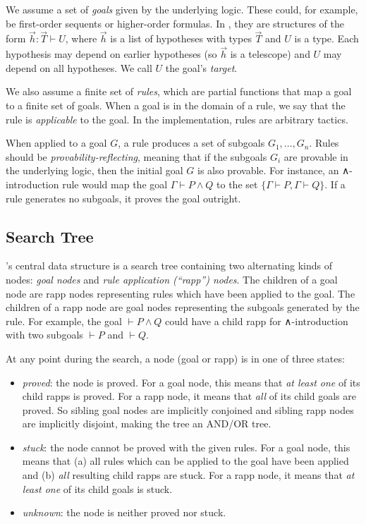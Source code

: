 We assume a set of \emph{goals} given by the underlying logic. These could, for example, be first-order sequents or higher-order formulas.
In \Lean, they are structures of the form $\vec{h} : \vec{T} ⊢ U$, where $\vec{h}$ is a list of hypotheses with types $\vec{T}$ and $U$ is a type.
Each hypothesis may depend on earlier hypotheses (so $\vec{h}$ is a telescope) and $U$ may depend on all hypotheses.
We call $U$ the goal's \emph{target}.

We also assume a finite set of \emph{rules}, which are partial functions that map a goal to a finite set of goals.
When a goal is in the domain of a rule, we say that the rule is \emph{applicable} to the goal.
In the \Aesop{} implementation, rules are arbitrary tactics.

When applied to a goal $G$, a rule produces a set of subgoals $G_{1},\dots,G_{n}$.
Rules should be \emph{provability-reflecting}, meaning that if the subgoals $G_{i}$ are provable in the underlying logic, then the initial goal $G$ is also provable.
For instance, an ∧-introduction rule would map the goal $Γ ⊢ P ∧ Q$ to the set $\{Γ ⊢ P, Γ ⊢ Q\}$.
If a rule generates no subgoals, it proves the goal outright.


\subsection{Search Tree}%
\label{sec:search-tree}

\Aesop's central data structure is a search tree containing two alternating kinds of nodes: \emph{goal nodes} and \emph{rule application (\enquote{rapp}) nodes}.
The children of a goal node are rapp nodes representing rules which have been applied to the goal.
The children of a rapp node are goal nodes representing the subgoals generated by the rule.
For example, the goal $⊢ P ∧ Q$ could have a child rapp for ∧-introduction with two subgoals $⊢ P$ and $⊢ Q$.

At any point during the search, a node (goal or rapp) is in one of three states:
\begin{itemize}
  \item
    \emph{proved}: the node is proved.
    For a goal node, this means that \emph{at least one} of its child rapps is proved.
    For a rapp node, it means that \emph{all} of its child goals are proved.
    So sibling goal nodes are implicitly conjoined and sibling rapp nodes are implicitly disjoint, making the tree an AND/OR tree.
  \item
    \emph{stuck}: the node cannot be proved with the given rules.
    For a goal node, this means that (a) all rules which can be applied to the goal have been applied and (b) \emph{all} resulting child rapps are stuck.
    For a rapp node, it means that \emph{at least one} of its child goals is stuck.
  \item \emph{unknown}: the node is neither proved nor stuck.
\end{itemize}

